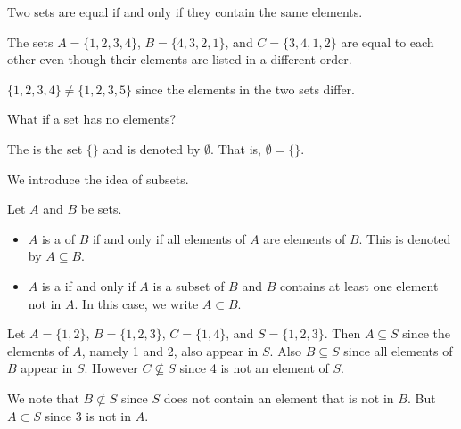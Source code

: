 \begin{definition}
    Two sets are equal if and only if they contain the same elements.
\end{definition}

\begin{example}
    The sets $A = \{1, 2, 3, 4\}$, $B = \{4, 3, 2, 1\}$, and $C = \{3, 4, 1, 2\}$ are equal to each other even though their elements are listed in a different order.
\end{example}

\begin{example}
    $\{1, 2, 3, 4\} \neq \{1, 2, 3, 5\}$ since the elements in the two sets differ.
\end{example}

What if a set has no elements?
\begin{definition}
    The  is the set $\{\}$ and is denoted by $\emptyset$. That is, $\emptyset = \{\}$.
\end{definition}

\pagebreak

We introduce the idea of subsets.
\begin{definition}
    Let $A$ and $B$ be sets.
    \begin{itemize}
        \item $A$ is a  of $B$ if and only if all elements of $A$ are elements of $B$. This is denoted by $A \subseteq B$.
        \item $A$ is a  if and only if $A$ is a subset of $B$ and $B$ contains at least one element not in $A$. In this case, we write $A \subset B$.
    \end{itemize}
\end{definition}

\begin{example}
    Let $A = \{1, 2\}$, $B = \{1, 2, 3\}$, $C = \{1, 4\}$, and $S = \{1, 2, 3\}$. Then $A \subseteq S$ since the elements of $A$, namely 1 and 2, also appear in $S$. Also $B \subseteq S$ since all elements of $B$ appear in $S$. However $C \not\subseteq S$ since 4 is not an element of $S$.

    We note that $B \not\subset S$ since $S$ does not contain an element that is not in $B$. But $A \subset S$ since 3 is not in $A$.
\end{example}

